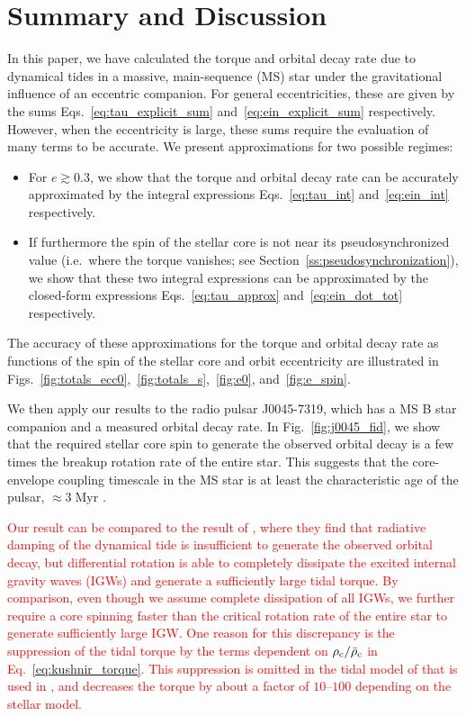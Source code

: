 \documentclass[
        fleqn,
        usenatbib,
    ]{mnras}
\begin{document}
\section{Summary and Discussion}\label{s:disc}

In this paper, we have calculated the torque and orbital decay rate due to
dynamical tides in a massive, main-sequence (MS) star under the gravitational
influence of an eccentric companion. For general eccentricities, these are
given by the sums Eqs.~\eqref{eq:tau_explicit_sum}
and~\eqref{eq:ein_explicit_sum} respectively. However, when the eccentricity is
large, these sums require the evaluation of many terms to be accurate. We
present approximations for two possible regimes:
\begin{itemize}
    \item For $e \gtrsim 0.3$, we show that the torque and orbital decay rate
        can be accurately approximated by the integral expressions
        Eqs.~\eqref{eq:tau_int} and~\eqref{eq:ein_int} respectively.

    \item If furthermore the spin of the stellar core is not near its
        pseudosynchronized value (i.e.\ where the torque vanishes; see
        Section~\ref{ss:pseudosynchronization}), we show that these two integral
        expressions can be approximated by the closed-form expressions
        Eqs.~\eqref{eq:tau_approx} and~\eqref{eq:ein_dot_tot} respectively.
\end{itemize}
The accuracy of these approximations for the torque and orbital decay rate as
functions of the spin of the stellar core and orbit eccentricity are illustrated
in Figs.~\ref{fig:totals_ecc0},~\ref{fig:totals_s},~\ref{fig:e0},
and~\ref{fig:e_spin}.

We then apply our results to the radio pulsar J0045-7319, which has a MS B star
companion and a measured orbital decay rate. In Fig.~\ref{fig:j0045_fid}, we
show that the required stellar core spin to generate the observed orbital decay
is a few times the breakup rotation rate of the entire star. This suggests that
the core-envelope coupling timescale in the MS star is at least the
characteristic age of the pulsar, $\approx 3\;\mathrm{Myr}$
\citep{kaspi1996params}.

\textcolor{red}{
Our result can be compared to the result of \citet{kumar1998}, where they find
that radiative damping of the dynamical tide is insufficient to generate the
observed orbital decay, but differential rotation is able to completely
dissipate the excited internal gravity waves (IGWs) and generate a sufficiently
large tidal torque. By comparison, even though we assume complete dissipation of
all IGWs, we further require a core spinning faster than the critical rotation
rate of the entire star to generate sufficiently large IGW\@. One reason for
this discrepancy is the suppression of the tidal torque by the terms dependent
on $\rho_{\rm c} / \bar{\rho}_{\rm c}$ in Eq.~\eqref{eq:kushnir_torque}. This
suppression is omitted in the tidal model of \citet{goldreich1989tidal} that is
used in \citet{kumar1998} \citet[as pointed out by][]{kushnir}, and decreases
the torque by about a factor of $10$--$100$ depending on the stellar model.
}
\end{document}
